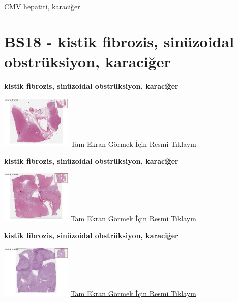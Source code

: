 \documentclass[
  letterpaper,
  DIV=11,
  numbers=noendperiod]{scrreprt}
\begin{document}
\begin{tcolorbox}[enhanced jigsaw, breakable, opacitybacktitle=0.6, arc=.35mm, colbacktitle=quarto-callout-tip-color!10!white, colback=white, toptitle=1mm, left=2mm, opacityback=0, colframe=quarto-callout-tip-color-frame, titlerule=0mm, rightrule=.15mm, bottomrule=.15mm, toprule=.15mm, bottomtitle=1mm, title=\textcolor{quarto-callout-tip-color}{\faLightbulb}\hspace{0.5em}{Tanı}, coltitle=black, leftrule=.75mm]

CMV hepatiti, karaciğer

\end{tcolorbox}

\hypertarget{sec-BS18}{%
\section{BS18 - kistik fibrozis, sinüzoidal obstrüksiyon,
karaciğer}\label{sec-BS18}}

\textbf{kistik fibrozis, sinüzoidal obstrüksiyon, karaciğer}

\href{https://images.patolojiatlasi.com/BS18/HE1.html}{\includegraphics[width=0.25\textwidth,height=\textheight]{./screenshots/thumbnail_BS18-HE1.png}}
\href{https://images.patolojiatlasi.com/BS18/HE1.html}{Tam Ekran Görmek
İçin Resmi Tıklayın}

\textbf{kistik fibrozis, sinüzoidal obstrüksiyon, karaciğer}

\href{https://images.patolojiatlasi.com/BS18/HE2.html}{\includegraphics[width=0.25\textwidth,height=\textheight]{./screenshots/thumbnail_BS18-HE2.png}}
\href{https://images.patolojiatlasi.com/BS18/HE2.html}{Tam Ekran Görmek
İçin Resmi Tıklayın}

\textbf{kistik fibrozis, sinüzoidal obstrüksiyon, karaciğer}

\href{https://images.patolojiatlasi.com/BS18/PAS.html}{\includegraphics[width=0.25\textwidth,height=\textheight]{./screenshots/thumbnail_BS18-PAS.png}}
\href{https://images.patolojiatlasi.com/BS18/PAS.html}{Tam Ekran Görmek
İçin Resmi Tıklayın}
\end{document}
